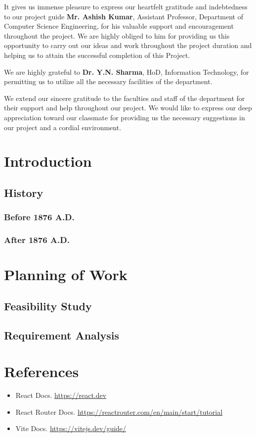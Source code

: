 \documentclass[12pt, a4paper]{article}
\begin{document}
It gives us immense pleasure to express our heartfelt gratitude and indebtedness to our project guide \textbf{Mr. Ashish Kumar}, Assistant Professor, Department of Computer Science Engineering, for his valuable support and encouragement throughout the project. We are highly obliged to him for providing us this opportunity to carry out our ideas and work throughout the project duration and helping us to attain the successful completion of this Project.\par
We are highly grateful to \textbf{Dr. Y.N. Sharma}, HoD, Information Technology, for permitting us to utilize all the necessary facilities of the department.\par
We extend our sincere gratitude to the faculties and staff of the department for their support and help throughout our project. We would like to express our deep appreciation toward our classmate for providing us the necessary suggestions in our project and a cordial environment.



\newpage
\tableofcontents

\newpage
\section{Introduction}
\subsection{History}
\subsubsection{Before 1876 A.D.}
\blindtext
\subsubsection{After 1876 A.D.}
\blindtext

\section{Planning of Work}
\subsection{Feasibility Study}
\blindtext
\subsection{Requirement Analysis}
\blindtext

\newpage
\section{References}

\begin{itemize}
    \item React Docs. \url{https://react.dev}
    \item React Router Docs. \url{https://reactrouter.com/en/main/start/tutorial}
    \item Vite Docs. \url{https://vitejs.dev/guide/}
\end{itemize}
\end{document}
